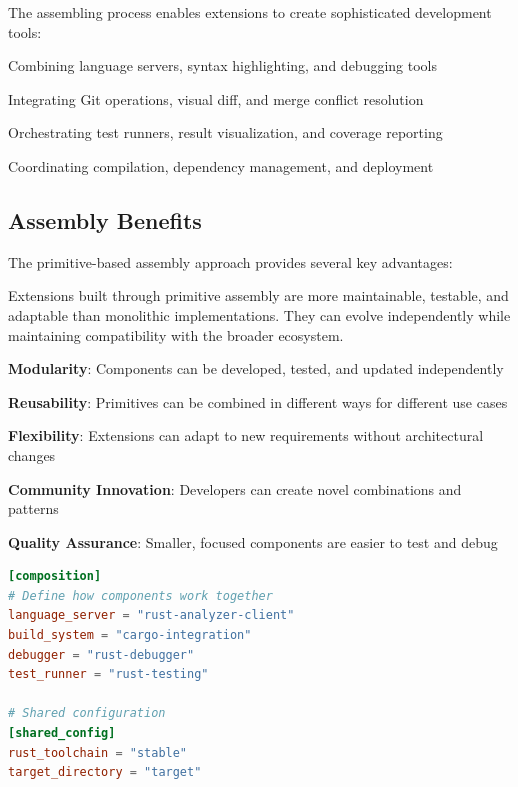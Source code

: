 The assembling process enables extensions to create sophisticated development tools:

\begin{description}[leftmargin=4cm,labelwidth=3.5cm]
    \item[\textbf{Language Support}] Combining language servers, syntax highlighting, and debugging tools
    \item[\textbf{Source Control}] Integrating Git operations, visual diff, and merge conflict resolution
    \item[\textbf{Testing Frameworks}] Orchestrating test runners, result visualization, and coverage reporting
    \item[\textbf{Build Systems}] Coordinating compilation, dependency management, and deployment
\end{description}

\subsection*{Assembly Benefits}

The primitive-based assembly approach provides several key advantages:

\begin{successbox}
Extensions built through primitive assembly are more maintainable, testable, and adaptable than monolithic implementations. They can evolve independently while maintaining compatibility with the broader ecosystem.
\end{successbox}

\begin{compactlist}
    \item \textbf{Modularity}: Components can be developed, tested, and updated independently
    \item \textbf{Reusability}: Primitives can be combined in different ways for different use cases
    \item \textbf{Flexibility}: Extensions can adapt to new requirements without architectural changes
    \item \textbf{Community Innovation}: Developers can create novel combinations and patterns
    \item \textbf{Quality Assurance}: Smaller, focused components are easier to test and debug
\end{compactlist}

\begin{lstlisting}[language=toml, caption=Component Composition Configuration]
[composition]
# Define how components work together
language_server = "rust-analyzer-client"
build_system = "cargo-integration"
debugger = "rust-debugger"
test_runner = "rust-testing"

# Shared configuration
[shared_config]
rust_toolchain = "stable"
target_directory = "target"
\end{lstlisting}

